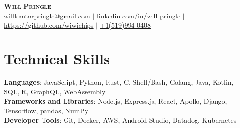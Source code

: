 \documentclass[letterpaper,11pt]{article}
\begin{document}
\begin{center}
    \textbf{\color{Fuchsia} \Huge \scshape Will Pringle} \\ \vspace{1pt}
    \small \href{mailto:willkantorpringle@gmail.com}{\underline{willkantorpringle@gmail.com}} $|$ 
    \href{https://www.linkedin.com/in/will-pringle/}{\underline{linkedin.com/in/will-pringle}} $|$
    \href{https://github.com/wiwichips}{\underline{https://github.com/wiwichips}} $|$
    \href{tel:+15199940408}{\underline{+1(519)994-0408}}
\end{center}



\section{Technical Skills}
  \begin{itemize}[leftmargin=0.15in, label={}]
    \small{\item{
      \textbf{Languages}{: JavaScript, Python, Rust, C, Shell/Bash, Golang, Java, Kotlin, SQL, R, GraphQL, WebAssembly} \\
      \textbf{Frameworks and Libraries}{: Node.js, Express.js, React, Apollo, Django, Tensorflow, pandas, NumPy} \\
      \textbf{Developer Tools}{: Git, Docker, AWS, Android Studio, Datadog, Kubernetes} \\
    }}
  \end{itemize}


\end{document}
